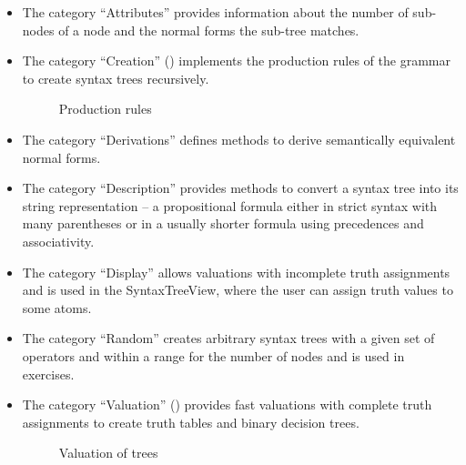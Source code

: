 \begin{itemize}
\item The category “Attributes”  provides information about the number of sub-nodes of a node 
and the normal forms the sub-tree matches.

\item The category “Creation” ()
implements the production rules of the grammar to create syntax trees recursively.

\begin{figure}[htbp]
\begin{center}
\caption{Production rules}
\label{fig:NyayaNodeCreation}
\end{center}
\end{figure}

\item The category “Derivations” defines methods to derive semantically equivalent normal forms.

\item The category “Description” provides methods to convert a syntax tree into its string representation – 
a propositional formula either in strict syntax with many parentheses or in a usually shorter formula using precedences and associativity.
\item The category “Display”  allows valuations with incomplete truth assignments and is
used in the SyntaxTreeView, where the user can assign truth values to some atoms.
\item The category “Random” creates arbitrary syntax trees with a given set of operators and within a range for the number of nodes and is used in exercises.
\item The category “Valuation” () 
provides fast valuations with complete truth assignments to create truth tables and binary decision trees. 

\begin{figure}[htbp]
\begin{center}
\caption{Valuation of trees}
\label{fig:NyayaNodeValuation}
\end{center}
\end{figure}

\end{itemize}





